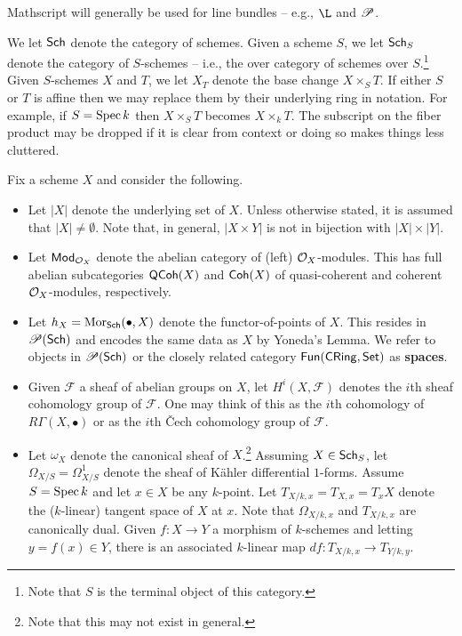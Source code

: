 \documentclass[11pt]{article}
\newcommand{\F}{\mathscr{F}}
\begin{document}
Mathscript will generally be used for line bundles -- e.g., $\L$ and $\mathscr{P}$. 

We let $\operatorname{\mathsf{Sch}}$ denote the category of schemes. Given a scheme $S$, we let $\operatorname{\mathsf{Sch}}_S$ denote the category of $S$-schemes -- i.e., the over category of schemes over $S$.\footnote{Note that $S$ is the terminal object of this category.} Given $S$-schemes $X$ and $T$, we let $X_T$ denote the base change $X\times_ST$. If either $S$ or $T$ is affine then we may replace them by their underlying ring in notation. For example, if $S=\operatorname{Spec} k$ then $X\times_ST$ becomes $X\times_kT$. The subscript on the fiber product may be dropped if it is clear from context or doing so makes things less cluttered.

Fix a scheme $X$ and consider the following.
\begin{itemize}
\item Let $|X|$ denote the underlying set of $X$. Unless otherwise stated, it is assumed that $|X|\neq\emptyset$. Note that, in general, $|X\times Y|$ is not in bijection with $|X|\times|Y|$.

\item Let $\operatorname{\mathsf{Mod}}_{\mathcal{O}_X}$ denote the abelian category of (left) $\mathcal{O}_X$-modules. This has full abelian subcategories $\operatorname{\mathsf{QCoh}}(X)$ and $\operatorname{\mathsf{Coh}}(X)$ of quasi-coherent and coherent $\mathcal{O}_X$-modules, respectively.

\item Let $h_X=\operatorname{Mor}_{\operatorname{\mathsf{Sch}}}(\bullet,X)$ denote the functor-of-points of $X$. This resides in $\mathscr{P}(\operatorname{\mathsf{Sch}})$ and encodes the same data as $X$ by Yoneda's Lemma. We refer to objects in $\mathscr{P}(\operatorname{\mathsf{Sch}})$ or the closely related category $\operatorname{\mathsf{Fun}}(\operatorname{\mathsf{CRing}},\operatorname{\mathsf{Set}})$ as \textbf{spaces}. 

\item Given $\F$ a sheaf of abelian groups on $X$, let $H^i(X,\F)$ denotes the $i$th sheaf cohomology group of $\F$. One may think of this as the $i$th cohomology of $R\Gamma(X,\bullet)$ or as the $i$th \v{C}ech cohomology group of $\F$.

\item Let $\omega_X$ denote the canonical sheaf of $X$.\footnote{Note that this may not exist in general.} Assuming $X\in\operatorname{\mathsf{Sch}}_S$, let $\Omega_{X/S}=\Omega_{X/S}^1$ denote the sheaf of K\"{a}hler differential $1$-forms. Assume $S=\operatorname{Spec} k$ and let $x\in X$ be any $k$-point. Let $T_{X/k,x}=T_{X,x}=T_xX$ denote the ($k$-linear) tangent space of $X$ at $x$. Note that $\Omega_{X/k,x}$ and $T_{X/k,x}$ are canonically dual. Given $f: X\to Y$ a morphism of $k$-schemes and letting $y=f(x)\in Y$, there is an associated $k$-linear map $df: T_{X/k,x}\to T_{Y/k,y}$.
\end{itemize}
\end{document}
